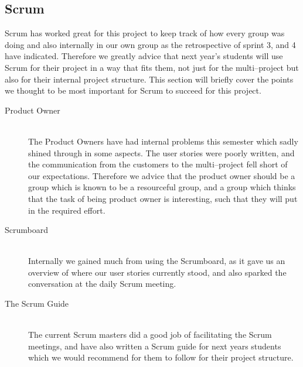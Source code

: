 \subsection{Scrum}
Scrum has worked great for this project to keep track of how every group was doing and also internally in our own group as the retrospective of sprint 3, and 4 have indicated.
Therefore we greatly advice that next year's students will use Scrum for their project in a way that fits them, not just for the multi--project but also for their internal project structure.
This section will briefly cover the points we thought to be most important for Scrum to succeed for this project.

\begin{description}
	\item[Product Owner] \hfill \\
	The Product Owners have had internal problems this semester which sadly shined through in some aspects.
	The user stories were poorly written, and the communication from the customers to the multi--project fell short of our expectations.
	Therefore we advice that the product owner should be a group which is known to be a resourceful group, and a group which thinks that the task of being product owner is interesting, such that they will put in the required effort.

	\item[Scrumboard] \hfill \\
	Internally we gained much from using the Scrumboard, as it gave us an overview of where our user stories currently stood, and also sparked the conversation at the daily Scrum meeting.

	\item[The Scrum Guide] \hfill \\
	The current Scrum masters did a good job of facilitating the Scrum meetings, and have also written a Scrum guide for next years students which we would recommend for them to follow for their project structure.
\end{description}
